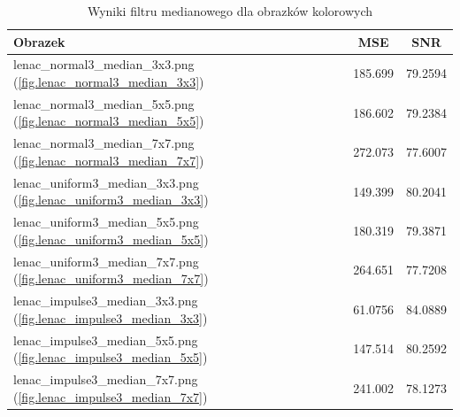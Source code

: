 \documentclass{classrep}
\begin{document}
\begin{table}
  \centering
  \begin{tabular}{|l|c|c|}
    \hline
    \textbf{Obrazek} & \textbf{MSE} & \textbf{SNR} \\
    \hline\hline
    lenac\_normal3\_median\_3x3.png (\ref{fig.lenac_normal3_median_3x3}) & 185.699 & 79.2594 \\
    \hline
    lenac\_normal3\_median\_5x5.png (\ref{fig.lenac_normal3_median_5x5}) & 186.602 & 79.2384 \\
    \hline
    lenac\_normal3\_median\_7x7.png (\ref{fig.lenac_normal3_median_7x7}) & 272.073 & 77.6007 \\
    \hline
    lenac\_uniform3\_median\_3x3.png (\ref{fig.lenac_uniform3_median_3x3}) & 149.399 & 80.2041 \\
    \hline
    lenac\_uniform3\_median\_5x5.png (\ref{fig.lenac_uniform3_median_5x5}) & 180.319 & 79.3871 \\
    \hline
    lenac\_uniform3\_median\_7x7.png (\ref{fig.lenac_uniform3_median_7x7}) & 264.651 & 77.7208 \\
    \hline
    lenac\_impulse3\_median\_3x3.png (\ref{fig.lenac_impulse3_median_3x3}) & 61.0756 & 84.0889 \\
    \hline
    lenac\_impulse3\_median\_5x5.png (\ref{fig.lenac_impulse3_median_5x5}) & 147.514 & 80.2592 \\
    \hline
    lenac\_impulse3\_median\_7x7.png (\ref{fig.lenac_impulse3_median_7x7}) & 241.002 & 78.1273 \\
    \hline
  \end{tabular}
  \caption{Wyniki filtru medianowego dla obrazków kolorowych}
  \label{tab.lenac_median}
\end{table}
\end{document}
